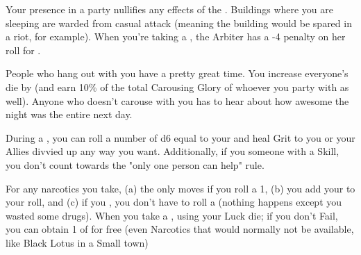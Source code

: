 

  
    Your presence in a party nullifies any effects of the . Buildings where you are sleeping are warded from casual attack (meaning the building would be spared in a riot, for example).  When you're taking a , the Arbiter has a -4 penalty on her roll for . 

  
    People who hang out with you have a pretty great time.  You increase everyone's  die by \DCUP (and earn 10\% of the total Carousing Glory of whoever you party with as well). Anyone who doesn't carouse with you has to hear about how awesome the night was the entire next day.    

  
    During a , you can roll a number of d6 equal to your \LVL and heal \SUM Grit to you or your Allies divvied up any way you want.  Additionally, if you  someone with a Skill, you don't count towards the "only one person can help" rule.


    For any narcotics you take, (a) the \UD only moves \DCDOWN if you roll a 1, (b) you add your \LVL to your  roll, and (c) if you , you don't have to roll a  (nothing happens except you wasted some drugs).  When you take a , \RS using your Luck die; if you don't Fail, you can obtain 1 \UD of   for free (even Narcotics that would normally not be available, like Black Lotus in a Small town)

